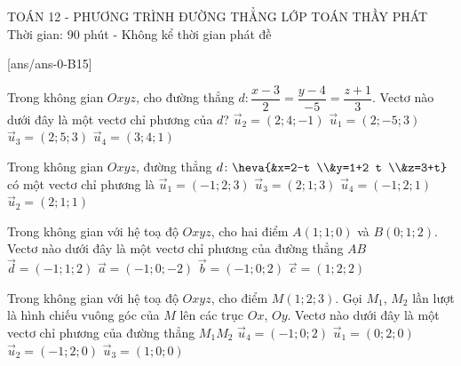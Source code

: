 
\begin{name}
	{\tenchude}
	{TOÁN 12 - PHƯƠNG TRÌNH ĐƯỜNG THẲNG}
	{LỚP TOÁN THẦY PHÁT}
	{Thời gian: 90 phút - Không kể thời gian phát đề}
\end{name}
[ans/ans-0-B15]
\caulc
\begin{ex} Trong không gian $Oxyz$, cho đường thẳng $d\colon \dfrac{x-3}{2}=\dfrac{y-4}{-5}=\dfrac{z+1}{3}$. Vectơ nào dưới đây là một vectơ chỉ phương của $d$?
	\choice
	{$\overrightarrow{u}_2=(2; 4;-1)$}
	{\True $\overrightarrow{u}_1=(2;-5; 3)$}
	{$\overrightarrow{u}_3=(2; 5; 3)$}
	{$\overrightarrow{u}_4=(3; 4; 1)$}
\end{ex}
\begin{ex}Trong không gian $Oxyz$, đường thẳng $d\colon \heva{&x=2-t \\&y=1+2 t \\&z=3+t}$ có một vectơ chỉ phương là
	\choice
	{$\overrightarrow{u}_1=(-1; 2; 3)$}
	{$\overrightarrow{u}_3=(2; 1; 3)$}
	{\True $\overrightarrow{u}_4=(-1; 2; 1)$}
	{$\overrightarrow{u}_2=(2; 1; 1)$}
\end{ex}
\begin{ex}Trong không gian với hệ toạ độ $Oxyz$, cho hai điểm $A(1; 1; 0)$ và $B(0;1;2)$. Vectơ nào dưới đây là một vectơ chỉ phương của đường thẳng $AB$
	\choice
	{$\overrightarrow{d}=(-1; 1; 2)$}
	{$\overrightarrow{a}=(-1; 0;-2)$}
	{\True $\overrightarrow{b}=(-1; 0; 2)$}
	{$\overrightarrow{c}=(1; 2; 2)$}
\end{ex}
\begin{ex}Trong không gian với hệ toạ độ $Oxyz$, cho điểm $M(1; 2; 3)$. Gọi $M_1$, $M_2$ lần lượt là hình chiếu vuông góc của $M$ lên các trục $Ox$, $Oy$. Vectơ nào dưới đây là một vectơ chỉ phương của đường thẳng $M_1M_2$
	\choice
	{$\overrightarrow{u}_4=(-1; 0; 2)$}
	{$\overrightarrow{u}_1=(0; 2; 0)$}
	{\True $\overrightarrow{u}_2=(-1; 2; 0)$}
	{$\overrightarrow{u}_3=(1; 0; 0)$}
\end{ex}
